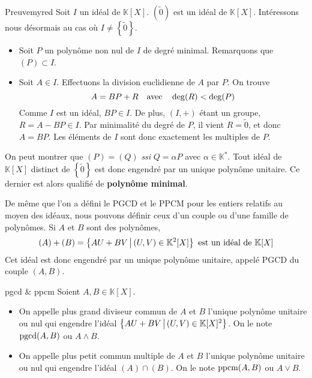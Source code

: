     \begin{demo}{Preuve}{myred}
        Soit $I$ un idéal de $\mathbb{K}[X]$. $(\tilde{0})$ est un idéal de $\mathbb{K}[X]$. Intéressons nous désormais au cas où $I \neq \left\{\tilde{0}\right\}$.
        \begin{itemize}
            \item Soit $P$ un polynôme non nul de $I$ de degré minimal. Remarquons que $(P) \subset I$.
            \item Soit $A \in I$. Effectuons la division euclidienne de $A$ par $P$. On trouve 
            \[ A = BP + R \quad \text{avec} \quad \deg(R) < \deg(P) \]   
            Comme $I$ est un idéal, $BP \in I$. De plus, $(I,+)$ étant un groupe, $R = A - BP \in I$. Par minimalité du degré de $P$, il vient $R = \tilde{0}$, et donc $A = BP$. Les éléments de $I$ sont donc exactement les multiples de $P$.
        \end{itemize}
    \end{demo}

    On peut montrer que $(P) = (Q)$ \textit{ssi} $Q = \alpha P$ avec $\alpha \in \mathbb{K}^*$. Tout idéal de $\mathbb{K}[X]$ distinct de $\left\{\tilde{0}\right\}$ est donc engendré par un unique polynôme unitaire. Ce dernier est alors qualifié de \textbf{polynôme minimal}.

    De même que l’on a défini le PGCD et le PPCM pour les entiers relatifs au moyen des idéaux, nous pouvons définir ceux d’un couple ou d’une famille de polynômes. Si $A$ et $B$ sont des polynômes, 
    \[ (A) + (B) = \left\{AU + BV \, \middle| \, (U,V) \in \mathbb{K}^2[X]\right\} \text{ est un idéal de } \mathbb{K}[X] \]   
    Cet idéal est donc engendré par un unique polynôme unitaire, appelé PGCD du couple $(A,B)$.

    \begin{defi}{pgcd \& ppcm}{}
        Soient $A,B \in \mathbb{K}[X]$.
        \begin{itemize}
            \item On appelle plus grand diviseur commun de $A$ et $B$ l’unique polynôme unitaire ou nul qui engendre l’idéal $\left\{AU + BV \, \middle| \, (U,V) \in \mathbb{K}[X]^2\right\}$. On le note $\operatorname{pgcd}(A,B)$ ou $A \wedge B$.
            \item On appelle plus petit commun multiple de $A$ et $B$ l’unique polynôme unitaire ou nul qui engendre l’idéal $(A) \cap (B)$. On le note $\operatorname{ppcm}(A,B)$ ou $A \vee B$.
        \end{itemize}
    \end{defi}


